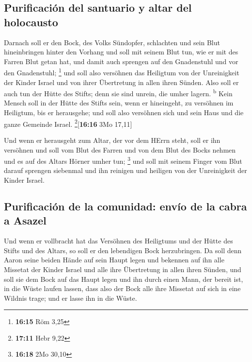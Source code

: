 \hypertarget{purificaciuxf3n-del-santuario-y-altar-del-holocausto}{%
\subsection{Purificación del santuario y altar del
holocausto}\label{purificaciuxf3n-del-santuario-y-altar-del-holocausto}}

 Darnach soll er den Bock, des Volks Sündopfer,
schlachten und sein Blut hineinbringen hinter den Vorhang und soll mit
seinem Blut tun, wie er mit des Farren Blut getan hat, und damit auch
sprengen auf den Gnadenstuhl und vor den Gnadenstuhl; \footnote{\textbf{16:15}
  Röm 3,25}  und soll also versöhnen das Heiligtum von
der Unreinigkeit der Kinder Israel und von ihrer Übertretung in allen
ihren Sünden. Also soll er auch tun der Hütte des Stifts; denn sie sind
unrein, die umher lagern. \textsuperscript{b}  Kein
Mensch soll in der Hütte des Stifts sein, wenn er hineingeht, zu
versöhnen im Heiligtum, bis er herausgehe; und soll also versöhnen sich
und sein Haus und die ganze Gemeinde Israel.
\footnote{\textbf{17:11} Hebr 9,22}{[}\textbf{16:16} 3Mo 17,11{]}

 Und wenn er herausgeht zum Altar, der vor dem HErrn
steht, soll er ihn versöhnen und soll vom Blut des Farren und von dem
Blut des Bocks nehmen und es auf des Altars Hörner umher tun;
\footnote{\textbf{16:18} 2Mo 30,10}  und soll mit seinem
Finger vom Blut darauf sprengen siebenmal und ihn reinigen und heiligen
von der Unreinigkeit der Kinder Israel.

\hypertarget{purificaciuxf3n-de-la-comunidad-envuxedo-de-la-cabra-a-asazel}{%
\subsection{Purificación de la comunidad: envío de la cabra a
Asazel}\label{purificaciuxf3n-de-la-comunidad-envuxedo-de-la-cabra-a-asazel}}

 Und wenn er vollbracht hat das Versöhnen des Heiligtums
und der Hütte des Stifts und des Altars, so soll er den lebendigen Bock
herzubringen.  Da soll denn Aaron seine beiden Hände auf
sein Haupt legen und bekennen auf ihn alle Missetat der Kinder Israel
und alle ihre Übertretung in allen ihren Sünden, und soll sie dem Bock
auf das Haupt legen und ihn durch einen Mann, der bereit ist, in die
Wüste laufen lassen,  dass also der Bock alle ihre
Missetat auf sich in eine Wildnis trage; und er lasse ihn in die Wüste.

